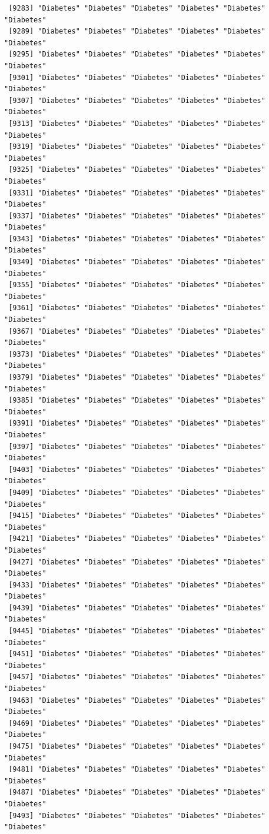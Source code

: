 \documentclass[
  letterpaper,
  DIV=11,
  numbers=noendperiod]{scrartcl}
\begin{document}
\begin{verbatim}
 [9283] "Diabetes" "Diabetes" "Diabetes" "Diabetes" "Diabetes" "Diabetes"
 [9289] "Diabetes" "Diabetes" "Diabetes" "Diabetes" "Diabetes" "Diabetes"
 [9295] "Diabetes" "Diabetes" "Diabetes" "Diabetes" "Diabetes" "Diabetes"
 [9301] "Diabetes" "Diabetes" "Diabetes" "Diabetes" "Diabetes" "Diabetes"
 [9307] "Diabetes" "Diabetes" "Diabetes" "Diabetes" "Diabetes" "Diabetes"
 [9313] "Diabetes" "Diabetes" "Diabetes" "Diabetes" "Diabetes" "Diabetes"
 [9319] "Diabetes" "Diabetes" "Diabetes" "Diabetes" "Diabetes" "Diabetes"
 [9325] "Diabetes" "Diabetes" "Diabetes" "Diabetes" "Diabetes" "Diabetes"
 [9331] "Diabetes" "Diabetes" "Diabetes" "Diabetes" "Diabetes" "Diabetes"
 [9337] "Diabetes" "Diabetes" "Diabetes" "Diabetes" "Diabetes" "Diabetes"
 [9343] "Diabetes" "Diabetes" "Diabetes" "Diabetes" "Diabetes" "Diabetes"
 [9349] "Diabetes" "Diabetes" "Diabetes" "Diabetes" "Diabetes" "Diabetes"
 [9355] "Diabetes" "Diabetes" "Diabetes" "Diabetes" "Diabetes" "Diabetes"
 [9361] "Diabetes" "Diabetes" "Diabetes" "Diabetes" "Diabetes" "Diabetes"
 [9367] "Diabetes" "Diabetes" "Diabetes" "Diabetes" "Diabetes" "Diabetes"
 [9373] "Diabetes" "Diabetes" "Diabetes" "Diabetes" "Diabetes" "Diabetes"
 [9379] "Diabetes" "Diabetes" "Diabetes" "Diabetes" "Diabetes" "Diabetes"
 [9385] "Diabetes" "Diabetes" "Diabetes" "Diabetes" "Diabetes" "Diabetes"
 [9391] "Diabetes" "Diabetes" "Diabetes" "Diabetes" "Diabetes" "Diabetes"
 [9397] "Diabetes" "Diabetes" "Diabetes" "Diabetes" "Diabetes" "Diabetes"
 [9403] "Diabetes" "Diabetes" "Diabetes" "Diabetes" "Diabetes" "Diabetes"
 [9409] "Diabetes" "Diabetes" "Diabetes" "Diabetes" "Diabetes" "Diabetes"
 [9415] "Diabetes" "Diabetes" "Diabetes" "Diabetes" "Diabetes" "Diabetes"
 [9421] "Diabetes" "Diabetes" "Diabetes" "Diabetes" "Diabetes" "Diabetes"
 [9427] "Diabetes" "Diabetes" "Diabetes" "Diabetes" "Diabetes" "Diabetes"
 [9433] "Diabetes" "Diabetes" "Diabetes" "Diabetes" "Diabetes" "Diabetes"
 [9439] "Diabetes" "Diabetes" "Diabetes" "Diabetes" "Diabetes" "Diabetes"
 [9445] "Diabetes" "Diabetes" "Diabetes" "Diabetes" "Diabetes" "Diabetes"
 [9451] "Diabetes" "Diabetes" "Diabetes" "Diabetes" "Diabetes" "Diabetes"
 [9457] "Diabetes" "Diabetes" "Diabetes" "Diabetes" "Diabetes" "Diabetes"
 [9463] "Diabetes" "Diabetes" "Diabetes" "Diabetes" "Diabetes" "Diabetes"
 [9469] "Diabetes" "Diabetes" "Diabetes" "Diabetes" "Diabetes" "Diabetes"
 [9475] "Diabetes" "Diabetes" "Diabetes" "Diabetes" "Diabetes" "Diabetes"
 [9481] "Diabetes" "Diabetes" "Diabetes" "Diabetes" "Diabetes" "Diabetes"
 [9487] "Diabetes" "Diabetes" "Diabetes" "Diabetes" "Diabetes" "Diabetes"
 [9493] "Diabetes" "Diabetes" "Diabetes" "Diabetes" "Diabetes" "Diabetes"

\end{verbatim}
\end{document}
